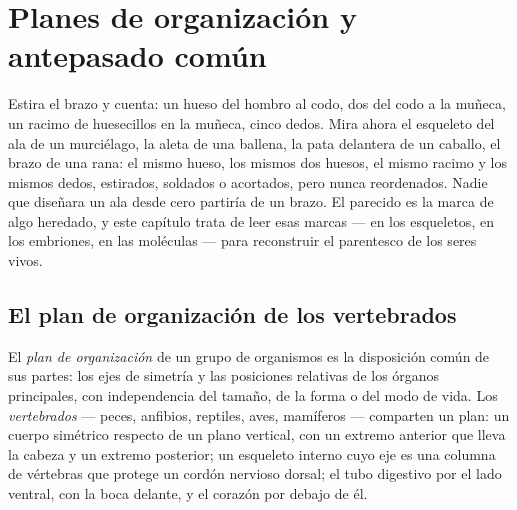 \chapter{Planes de organización y antepasado común}\label{ch:g10:common-ancestry}

Estira el brazo y cuenta: un hueso del hombro al codo, dos del codo a
la muñeca, un racimo de huesecillos en la muñeca, cinco dedos. Mira
ahora el esqueleto del ala de un murciélago, la aleta de una ballena,
la pata delantera de un caballo, el brazo de una rana: el mismo hueso,
los mismos dos huesos, el mismo racimo y los mismos dedos, estirados,
soldados o acortados, pero nunca reordenados. Nadie que diseñara un ala
desde cero partiría de un brazo. El parecido es la marca de algo
heredado, y este capítulo trata de leer esas marcas --- en los
esqueletos, en los embriones, en las moléculas --- para reconstruir el
parentesco de los seres vivos.

\section{El plan de organización de los vertebrados}

\begin{definition}\label{def:g10:common-ancestry:bodyplan}
El \emph{plan de organización} de un grupo
de organismos es la disposición común de sus partes: los ejes de
simetría y las posiciones relativas de los órganos principales, con
independencia del tamaño, de la forma o del modo de vida. Los
\emph{vertebrados} --- peces, anfibios, reptiles,
aves, mamíferos --- comparten un plan: un cuerpo simétrico respecto de
un plano vertical, con un extremo anterior que lleva la cabeza y un
extremo posterior; un esqueleto interno cuyo eje es una columna de
vértebras que protege un cordón nervioso dorsal; el tubo digestivo por
el lado ventral, con la boca delante, y el corazón por debajo de él.
\end{definition}

